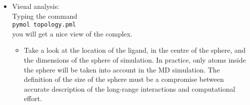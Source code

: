 \documentclass[a4paper,12pt]{article}
\newcommand{\qprep}{\texttt{qprep5}}
\begin{document}
\begin {itemize}
\begin {itemize}
    \item {\texttt { readprm ../FF{\_}Q/Qoplsaa.prm}}
    \item {\texttt { readpdb complex.pdb}}
    \item {\texttt { addbond 5480 6383 y}} (to form the bond between the Fe atom and the S of Cys 348; 
        "y" indicates that we accept the 2.2 {\AA} bond length. Note, that the atom numbers forming the bond can be found by typing
         {\texttt { listseq}} to see the sequence and {\texttt { listres}} to see the atom numbers in a given residue)
    \item {\texttt {boundary sphere 407:C1 18}} (the centre of the 18 {\AA} radius sphere of simulation will be the central atom of the ligand, indicated by residue:atom{\_}name)
    \item {\texttt {solvate 407:C1 18 1 HOH}} (solvate with TIP3P waters the sphere of simulation)
    \item {\texttt {maketop "cma compex topology"}} (make the topology, giving a title for it)
    \item {\texttt {writetop cma.top}}
    \item {\texttt {writepdb cma{\_}top.pdb y}} (we will have a pdb of the starting coordinates of the system; "y" indicates write GAP between molecules)
    \item {\texttt {quit}}
    \end {itemize}
We have generated the topology file, \texttt{cma.top}, which will be the file used as input for the MD simulation.\\
Alternatively you can write all {\qprep} commands in a separate
file ({\it e.g.} \texttt{maketop.inp} and run {\qprep} {\texttt {<
maketop.inp > maketop.log}}, so you can carefully analyze the
output given by the program.

\item Visual analysis: \\
Typing the command \\
\texttt{pymol topology.pml} \\
you will get a nice view of the complex.
\begin {itemize}
\item Take a look at the location of the ligand, in the centre of the sphere, and the dimensions of the sphere of simulation. In practice, only atoms inside the sphere will be taken into account in the MD simulation. The definition of the size of the sphere must be a compromise between accurate description of the long-range interactions and computational effort.
\end {itemize}
\end {itemize}
\end{document}
